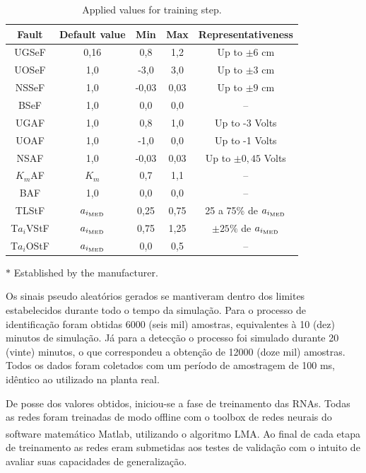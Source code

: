 \documentclass[10pt,fleqn,a4paper]{article}
\newcommand{\reg}{\textsuperscript{\textregistered}}
\begin{document}
\begin{table}[htb]
\small
\caption{Applied values for training step.}
\label{tab:values}
\centering
\begin{threeparttable}
\begin{tabular}{|c|c|c|c|c|}
\hline
{\bf Fault} & {\bf Default value} & {\bf Min} & {\bf Max} & 
{\bf Representativeness}\\
\hline
UGSeF & 0,16\tnote{$*$} & 
0,8 & 1,2 & Up to $\pm 6$ cm\\
\hline
UOSeF & 1,0 & -3,0 & 3,0 & Up to $\pm 3$ cm\\
\hline
NSSeF & 1,0 & -0,03 & 0,03 & Up to $\pm 9$ cm\\
\hline
BSeF & 1,0 & 0,0 & 0,0 & -- \\
\hline
UGAF & 1,0 & 0,8 & 1,0 & Up to -3 Volts\\
\hline
UOAF & 1,0 & -1,0 & 0,0 & Up to -1 Volts\\
\hline
NSAF & 1,0 & -0,03 & 0,03 & Up to $\pm 0,45$ Volts\\
\hline
$K_m$AF & $K_m$ & 0,7 & 1,1 & --\\
\hline
BAF & 1,0 & 0,0 & 0,0 & --\\
\hline
TLStF & $a_{i_{\text{\tiny MED}}}$ & 
0,25 & 0,75 & 25 a 75\% de $a_{i_{\text{\tiny MED}}}$\\
\hline
T$a_i$VStF & $a_{i_{\text{\tiny MED}}}$ & 
0,75 & 1,25 & $\pm 25\%$ de $a_{i_{\text{\tiny MED}}}$\\
\hline
T$a_i$OStF & $a_{i_{\text{\tiny MED}}}$ & 
0,0 & 0,5 & --\\
\hline
\end{tabular}
\begin{tablenotes}
\item [$*$] Established by the manufacturer.
\end{tablenotes}
\end{threeparttable}
\end{table}

Os sinais pseudo aleatórios gerados se mantiveram dentro dos limites
estabelecidos durante todo o tempo da simulação. Para o processo de
identificação foram obtidas 6000 (seis mil) amostras, equivalentes à 10 (dez)
minutos de simulação. Já para a detecção o processo foi simulado durante 20
(vinte) minutos, o que correspondeu a obtenção de 12000 (doze mil) amostras.
Todos os dados foram coletados com um período de amostragem de 100 ms, idêntico
ao utilizado na planta real.

De posse dos valores obtidos, iniciou-se a fase de treinamento das RNAs. Todas
as redes foram treinadas de modo offline com o toolbox de redes neurais do
software matemático Matlab\reg, utilizando o algoritmo LMA. Ao final de cada etapa
de treinamento as redes eram submetidas aos testes de validação com o intuito de
avaliar suas capacidades de generalização.
\end{document}
